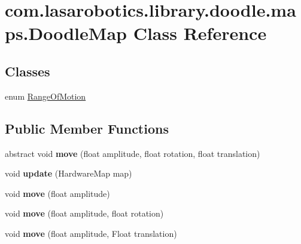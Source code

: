 \hypertarget{classcom_1_1lasarobotics_1_1library_1_1doodle_1_1maps_1_1_doodle_map}{}\section{com.\+lasarobotics.\+library.\+doodle.\+maps.\+Doodle\+Map Class Reference}
\label{classcom_1_1lasarobotics_1_1library_1_1doodle_1_1maps_1_1_doodle_map}
\subsection*{Classes}
\begin{DoxyCompactItemize}
\item 
enum \hyperlink{enumcom_1_1lasarobotics_1_1library_1_1doodle_1_1maps_1_1_doodle_map_1_1_range_of_motion}{Range\+Of\+Motion}
\end{DoxyCompactItemize}
\subsection*{Public Member Functions}
\begin{DoxyCompactItemize}
\item 
\hypertarget{classcom_1_1lasarobotics_1_1library_1_1doodle_1_1maps_1_1_doodle_map_a8aa4a66b3898eabd0e52021c9caef8c8}{}abstract void {\bfseries move} (float amplitude, float rotation, float translation)\label{classcom_1_1lasarobotics_1_1library_1_1doodle_1_1maps_1_1_doodle_map_a8aa4a66b3898eabd0e52021c9caef8c8}

\item 
\hypertarget{classcom_1_1lasarobotics_1_1library_1_1doodle_1_1maps_1_1_doodle_map_ad711db4ca49af749e97cb24b61e55b3f}{}void {\bfseries update} (Hardware\+Map map)\label{classcom_1_1lasarobotics_1_1library_1_1doodle_1_1maps_1_1_doodle_map_ad711db4ca49af749e97cb24b61e55b3f}

\item 
\hypertarget{classcom_1_1lasarobotics_1_1library_1_1doodle_1_1maps_1_1_doodle_map_a06f2d3d12abf0610c75ae84b67c881d9}{}void {\bfseries move} (float amplitude)\label{classcom_1_1lasarobotics_1_1library_1_1doodle_1_1maps_1_1_doodle_map_a06f2d3d12abf0610c75ae84b67c881d9}

\item 
\hypertarget{classcom_1_1lasarobotics_1_1library_1_1doodle_1_1maps_1_1_doodle_map_a6c532d8dead59345eefa04a878e8156a}{}void {\bfseries move} (float amplitude, float rotation)\label{classcom_1_1lasarobotics_1_1library_1_1doodle_1_1maps_1_1_doodle_map_a6c532d8dead59345eefa04a878e8156a}

\item 
\hypertarget{classcom_1_1lasarobotics_1_1library_1_1doodle_1_1maps_1_1_doodle_map_a7568760147e0f4cb0854d81ba2f2ab80}{}void {\bfseries move} (float amplitude, Float translation)\label{classcom_1_1lasarobotics_1_1library_1_1doodle_1_1maps_1_1_doodle_map_a7568760147e0f4cb0854d81ba2f2ab80}

\end{DoxyCompactItemize}

